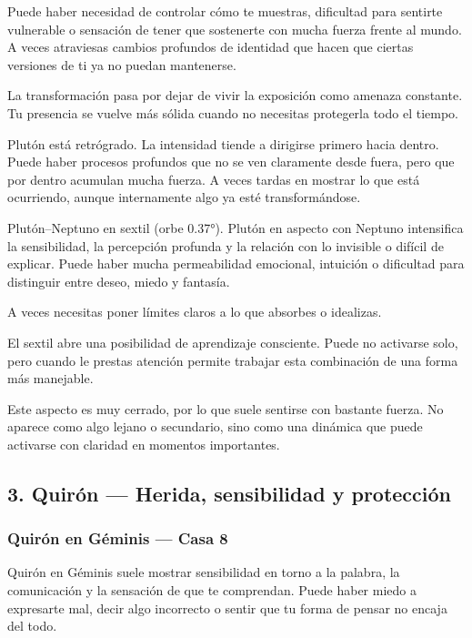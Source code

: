 \documentclass[11pt,a4paper]{article}
\begin{document}
Puede haber necesidad de controlar cómo te muestras, dificultad para sentirte vulnerable o sensación de tener que sostenerte con mucha fuerza frente al mundo. A veces atraviesas cambios profundos de identidad que hacen que ciertas versiones de ti ya no puedan mantenerse.

La transformación pasa por dejar de vivir la exposición como amenaza constante. Tu presencia se vuelve más sólida cuando no necesitas protegerla todo el tiempo.

Plutón está retrógrado. La intensidad tiende a dirigirse primero hacia dentro. Puede haber procesos profundos que no se ven claramente desde fuera, pero que por dentro acumulan mucha fuerza. A veces tardas en mostrar lo que está ocurriendo, aunque internamente algo ya esté transformándose.

Plutón–Neptuno en sextil (orbe 0.37°).
Plutón en aspecto con Neptuno intensifica la sensibilidad, la percepción profunda y la relación con lo invisible o difícil de explicar. Puede haber mucha permeabilidad emocional, intuición o dificultad para distinguir entre deseo, miedo y fantasía.

A veces necesitas poner límites claros a lo que absorbes o idealizas.

El sextil abre una posibilidad de aprendizaje consciente. Puede no activarse solo, pero cuando le prestas atención permite trabajar esta combinación de una forma más manejable.

Este aspecto es muy cerrado, por lo que suele sentirse con bastante fuerza. No aparece como algo lejano o secundario, sino como una dinámica que puede activarse con claridad en momentos importantes.

\vspace{0.4cm}

\subsection{3. Quirón — Herida, sensibilidad y protección}

\subsubsection*{Quirón en Géminis — Casa 8}

Quirón en Géminis suele mostrar sensibilidad en torno a la palabra, la comunicación y la sensación de que te comprendan. Puede haber miedo a expresarte mal, decir algo incorrecto o sentir que tu forma de pensar no encaja del todo.
\end{document}
